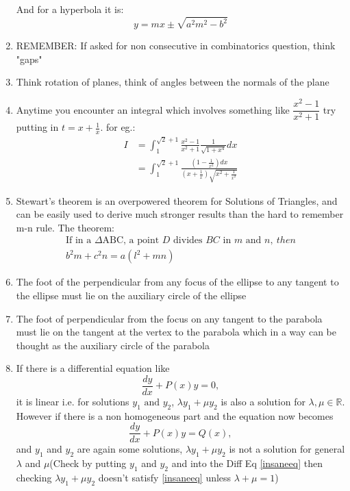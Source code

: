 \documentclass{article}
\numberwithin{equation}{section}
\numberwithin{figure}{section}
\begin{document}
\begin{enumerate}
			And for a hyperbola it is:
			\begin{equation}
				y=mx \pm \sqrt{a^2 m^2 - b^2}
			\end{equation}
		\item REMEMBER: If asked for non consecutive in combinatorics question, think "gaps"
		\item Think rotation of planes, think of angles between the normals of the plane
		\item Anytime you encounter an integral which involves something like $\dfrac{x^2-1}{x^2+1}$ try putting in $t=x+\frac{1}{x}$. for eg.:
			\begin{align*}
				I &=\int_{1}^{\sqrt{2}+1}\frac{x^2-1}{x^2+1}\frac{1}{\sqrt{1+x^4}}dx
			\\        &=\int_{1}^{\sqrt{2}+1}\frac{(1-\frac{1}{x^2})dx}{(x+\frac{1}{x})\sqrt{x^2+\frac{1}{x^2}}}
			\end{align*}
		\item Stewart's theorem is an overpowered theorem for Solutions of Triangles, and can be easily used to derive much stronger results than the hard to remember m-n rule. The theorem:
			\begin{align}
				\text{If in a } \Delta \text{ABC, a point } D \text{ divides } BC \text{ in } m \text{ and } n,\ then\\
				\boxed{b^2 m +c^2 n=a(l^2+mn)}
			\end{align}
		\item The foot of the perpendicular from any focus of the ellipse to any tangent to the ellipse must lie on the auxiliary circle of the ellipse 
		\item The foot of perpendicular from the focus on any tangent to the parabola must lie on the tangent at the vertex to the parabola which in a way can be thought as the auxiliary circle of the parabola

		\item If there is a differential equation like \begin{equation}\label{saneeq}\frac{dy}{dx}+P(x)y=0,\end{equation} it is linear i.e. for solutions $y_1 \text{ and } y_2$, $\lambda y_1+\mu y_2$ is also a solution for $\lambda ,\mu \in \mathbb{R} $. However if there is a non homogeneous part and the equation now becomes \begin{equation}\label{insaneeq}\frac{dy}{dx}+P(x)y=Q(x),\end{equation}and $y_1$ and $y_2$ are again some solutions, $\lambda y_1+\mu y_2$ is not a solution for general $\lambda$ and $\mu$(Check by putting $y_1$ and $y_2$ and into the Diff Eq \ref{insaneeq}  then  checking $\lambda y_1 +\mu y_2$ doesn't satisfy \ref{insaneeq} unless $\lambda+\mu=1$)


\end{enumerate}
\end{document}
